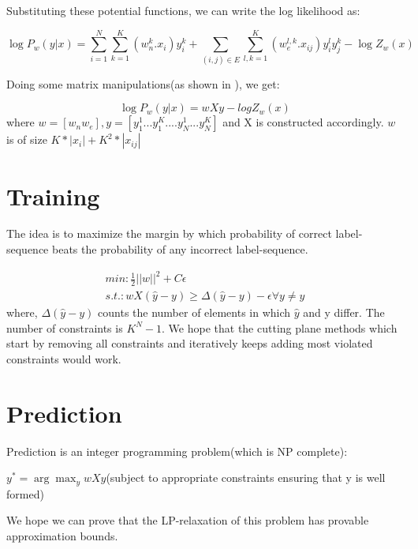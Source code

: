 \documentclass[11pt,a4paper,oneside]{report}
\begin{document}
Substituting these potential functions, we can write the log likelihood as: 

\begin{equation}
 \log P_w (y|x) = \sum_{i=1}^{N} \sum_{k=1}^{K} (w^{k}_{n}.x_{i})y_{i}^{k} + \sum_{(i,j)\in E} \sum_{l,k=1}^{K} (w_{e}^{l,k}.x_{ij})y_i^l y_j^k   -   \log Z_w(x)
\end{equation}

Doing some matrix manipulations(as shown in \cite{taskar2004learning}), we get:

\begin{equation}
 \log P_w (y|x) = wXy -logZ_w(x)
\end{equation}
where $w=[w_n w_e], y=[y_1^1...y_1^K....y_N^1...y_N^K]$ and X is constructed accordingly.
$w$ is of size $K*|x_i|+K^2*|x_{ij}|$

\section{Training}
The idea is to maximize the margin by which probability of correct label-sequence beats the probability of any incorrect label-sequence.

\begin{eqnarray*}
min: \frac{1}{2} ||w||^2 + C\epsilon\\
s.t.: wX(\hat{y}-y)\ge \Delta(\hat{y}-y) -\epsilon \forall y\neq \hat{y}
\end{eqnarray*}
where, $\Delta(\hat{y}-y)$ counts the number of elements in which $\hat{y}$ and y differ.
The number of constraints is $K^N-1$. We hope that the cutting plane methods\cite{joachims2009cutting} 
which start by removing all constraints and  iteratively keeps adding most violated constraints would work.
\section{Prediction}

Prediction is an integer programming problem(which is NP complete):

$y^*=\arg \max _y wXy$(subject to appropriate constraints ensuring that y is well formed)

We hope we can prove that the LP-relaxation of this problem has provable approximation bounds.


\end{document}

